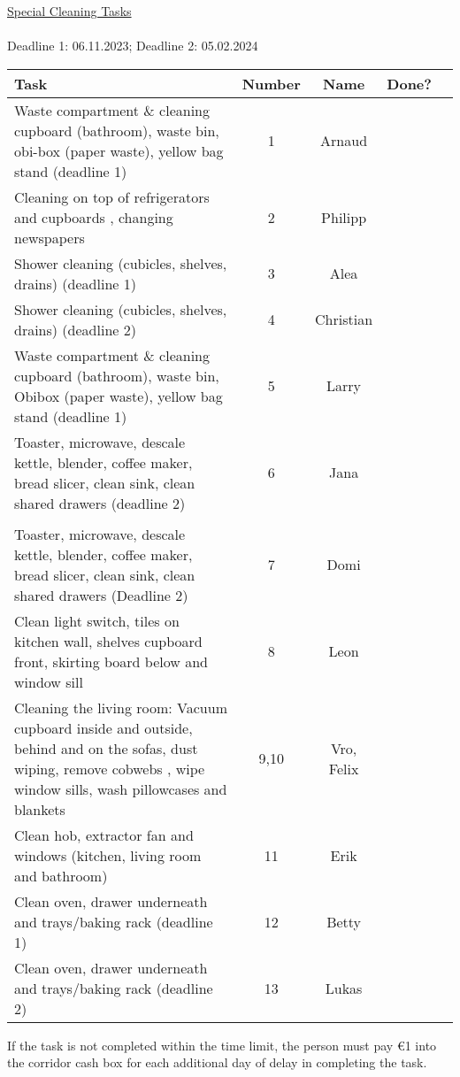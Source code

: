 \documentclass[pt14]{apa7}
\begin{document}
\pagestyle{empty}
{\Large\underline{Special Cleaning Tasks} \\ \\
Deadline 1: 06.11.2023; Deadline 2: 05.02.2024 }
\newline

\begin{table} [htb]
	\centering
	\begin{tabular}{p{8cm}cccc}
		\hline
		\textbf{Task} & \textbf{Number} & \textbf{Name} & \textbf{Done?} \\
		\hline
		Waste compartment \& cleaning cupboard (bathroom), waste bin, obi-box (paper waste), yellow bag stand (deadline 1)& 1 & Arnaud  & \quad \\ [7ex] 
		\hline
		Cleaning on top of refrigerators and cupboards , changing newspapers& 2 & Philipp
		  & \quad \\ [7ex]
		\hline
		 Shower cleaning (cubicles, shelves, drains) (deadline 1) & 3 & Alea & \quad \\[7ex]
		\hline
		Shower cleaning (cubicles, shelves, drains) (deadline 2) & 4 & Christian & \quad \\[7ex]
		\hline
		Waste compartment \& cleaning cupboard (bathroom), waste bin, Obibox (paper waste), yellow bag stand (deadline 1) & 5 & Larry & \quad \\[7ex]
		\hline
		Toaster, microwave, descale kettle, blender, coffee maker, bread slicer, clean sink, clean shared drawers (deadline 2) & 6 & Jana & \quad \\[7ex]\\
		\hline
		Toaster, microwave, descale kettle, blender, coffee maker, bread slicer, clean sink, clean shared drawers (Deadline 2) & 7 & Domi & \quad \\[7ex]
		\hline
		 Clean light switch, tiles on kitchen wall, shelves cupboard front, skirting board below and window sill & 8 & Leon & \quad \\[7ex]
		\hline
		 Cleaning the living room: Vacuum cupboard inside and outside, behind and on the sofas, dust wiping, remove cobwebs , wipe window sills, wash pillowcases and blankets& 9,10 & Vro, Felix & \quad \\ [7ex]
		\hline
		Clean hob, extractor fan and windows (kitchen, living room and bathroom) & 11 & Erik & \quad \\[7ex]
		\hline
		Clean oven, drawer underneath and trays/baking rack (deadline 1) & 12 & Betty & \quad \\[7ex]
		\hline
		Clean oven, drawer underneath and trays/baking rack (deadline 2) & 13 & Lukas & \quad \\[7ex]
		\hline
	\end{tabular}
\end{table}

If the task is not completed within the time limit, the person must pay €1 into the corridor cash box for each additional day of delay in completing the task.
\end{document}
